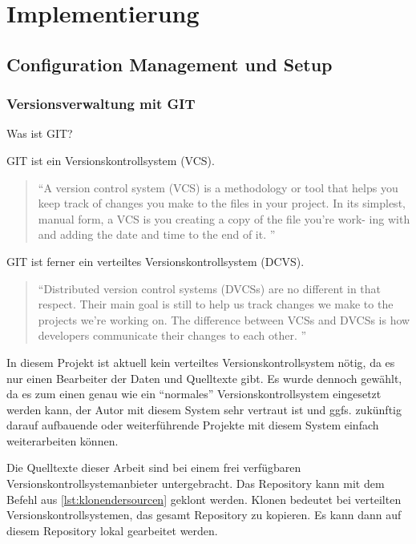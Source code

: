 \chapter{Implementierung} \label{kap:implementierung}

\section{Configuration Management und Setup}

\subsection{Versionsverwaltung mit GIT}

Was ist GIT?

GIT ist ein Versionskontrollsystem (VCS). 

\begin{quotation}
\enquote{A version control system (VCS) is a methodology or tool that helps you keep track of changes you make to the files in your project. In its simplest, manual form, a VCS is you creating a copy of the file you’re work- ing with and adding the date and time to the end of it. \citep[S. 15][]{pragGit}}
\end{quotation}

GIT ist ferner ein verteiltes Versionskontrollsystem (DCVS).

\begin{quotation}
\enquote{Distributed version control systems (DVCSs) are no different in that respect. Their main goal is still to help us track changes we make to the projects we’re working on. The difference between VCSs and DVCSs is how developers communicate their changes to each other. \citep[S. 15][]{pragGit}}
\end{quotation}

In diesem Projekt ist aktuell kein verteiltes Versionskontrollsystem nötig, da es nur einen Bearbeiter der Daten und Quelltexte gibt. Es wurde dennoch gewählt, da es zum einen genau wie ein \enquote{normales} Versionskontrollsystem eingesetzt werden kann, der Autor mit diesem System sehr vertraut ist und ggfs. zukünftig darauf aufbauende oder weiterführende Projekte mit diesem System einfach weiterarbeiten können. 

Die Quelltexte dieser Arbeit sind bei einem frei verfügbaren Versionskontrollsystemanbieter untergebracht. Das Repository kann mit dem Befehl aus \autoref{lst:klonendersourcen} geklont werden. Klonen bedeutet bei verteilten Versionskontrollsystemen, das gesamt Repository zu kopieren. Es kann dann auf diesem Repository lokal gearbeitet werden. 


